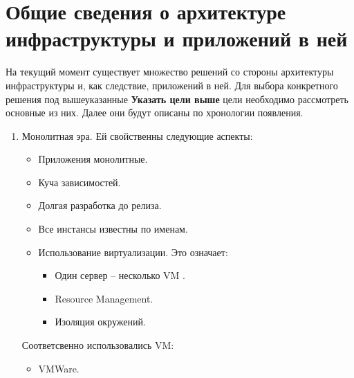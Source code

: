 \section{Общие сведения о архитектуре инфраструктуры и приложений в ней}
\label{sec:history}

На текущий момент существует множество решений со стороны архитектуры инфраструктуры и, как следствие, приложений в ней. Для выбора конкретного решения под вышеуказанные \textbf{Указать цели выше} цели необходимо рассмотреть основные из них. Далее они будут описаны по хронологии появления.

\begin{enumerate}
    \item Монолитная эра. Ей свойственны следующие аспекты:
        \begin{itemize}
            \item Приложения монолитные.
            \item Куча зависимостей.
            \item Долгая разработка до релиза.
            \item Все инстансы известны по именам.
            \item Использование виртуализации. Это означает:
                \begin{itemize}
                    \item Один сервер -- несколько VM \cite{wiki:vm}.
                    \item Resource Management.
                    \item Изоляция окружений.
                \end{itemize}
        \end{itemize}
        Соответсвенно использовались VM:
        \begin{itemize}
            \item VMWare.

\end{itemize}
\end{enumerate}
